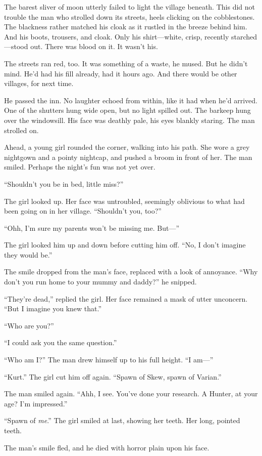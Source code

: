 The barest sliver of moon utterly failed to light the village beneath.
This did not trouble the man who strolled down its streets, heels clicking on the cobblestones.
The blackness rather matched his cloak as it rustled in the breeze behind him.
And his boots, trousers, and cloak.
Only his shirt---white, crisp, recently starched---stood out.
There was blood on it.
It wasn't his.


The streets ran red, too.
It was something of a waste, he mused.
But he didn't mind.
He'd had his fill already, had it hours ago.
And there would be other villages, for next time.

He passed the inn.
No laughter echoed from within, like it had when he'd arrived.
One of the shutters hung wide open, but no light spilled out.
The barkeep hung over the windowsill.
His face was deathly pale, his eyes blankly staring.
The man strolled on.

Ahead, a young girl rounded the corner, walking into his path.
She wore a grey nightgown and a pointy nightcap, and pushed a broom in front of her.
The man smiled.
Perhaps the night's fun was not yet over.

``Shouldn't you be in bed, little miss?''

The girl looked up.
Her face was untroubled, seemingly oblivious to what had been going on in her village.
``Shouldn't you, too?''

``Ohh, I'm sure my parents won't be missing me.
But---''

The girl looked him up and down before cutting him off.
``No, I don't imagine they would be.''

The smile dropped from the man's face, replaced with a look of annoyance.
``Why don't you run home to your mummy and daddy?'' he snipped.

``They're dead,'' replied the girl.
Her face remained a mask of utter unconcern.
``But I imagine you knew that.''

``Who are you?''

``I could ask you the same question.''

``Who am I?''
The man drew himself up to his full height.
``I am---''

``Kurt.''
The girl cut him off again.
``Spawn of Skew, spawn of Varian.''

The man smiled again.
``Ahh, I see.
You've done your research.
A Hunter, at your age?
I'm impressed.''

``Spawn of \emph{me}.''
The girl smiled at last, showing her teeth.
Her long, pointed teeth.

The man's smile fled, and he died with horror plain upon his face.
